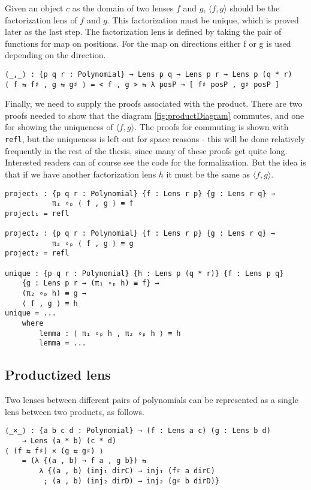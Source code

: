 Given an object $c$ as the domain of two lenses $f$ and $g$, $\langle f,g \rangle$ should be the factorization lens of $f$ and $g$. This factorization must be unique, which is proved later as the last step. The factorization lens is defined by taking the pair of functions for map on positions. For the map on directions either f or g is used depending on the direction.

\begin{verbatim}
⟨_,_⟩ : {p q r : Polynomial} → Lens p q → Lens p r → Lens p (q * r)
⟨ f ⇆ f♯ , g ⇆ g♯ ⟩ = < f , g > ⇆ λ posP → [ f♯ posP , g♯ posP ]
\end{verbatim}

Finally, we need to supply the proofs associated with the product. There are two proofs needed to show that the diagram \ref{fig:productDiagram} commutes, and one for showing the uniqueness of $\langle f,g \rangle$. The proofs for commuting is shown with \texttt{refl}, but the uniqueness is left out for space reasons - this will be done relatively frequently in the rest of the thesis, since many of these proofs get quite long. Interested readers can of course see the code for the formalization\cite{code}. But the idea is that if we have another factorization lens $h$ it must be the same as $\langle f,g \rangle$. 

\begin{verbatim}
project₁ : {p q r : Polynomial} {f : Lens r p} {g : Lens r q} →
           π₁ ∘ₚ ⟨ f , g ⟩ ≡ f
project₁ = refl

project₂ : {p q r : Polynomial} {f : Lens r p} {g : Lens r q} →
           π₂ ∘ₚ ⟨ f , g ⟩ ≡ g
project₂ = refl

unique : {p q r : Polynomial} {h : Lens p (q * r)} {f : Lens p q} 
    {g : Lens p r → (π₁ ∘ₚ h) ≡ f} →
    (π₂ ∘ₚ h) ≡ g → 
    ⟨ f , g ⟩ ≡ h
unique = ...
    where
        lemma : ⟨ π₁ ∘ₚ h , π₂ ∘ₚ h ⟩ ≡ h
        lemma = ...
\end{verbatim}

\subsection{Productized lens}
Two lenses between different pairs of polynomials can be represented as a single lens between two products, as follows.

\begin{verbatim}
⟨_×_⟩ : {a b c d : Polynomial} → (f : Lens a c) (g : Lens b d)
    → Lens (a * b) (c * d)
⟨ (f ⇆ f♯) × (g ⇆ g♯) ⟩ 
    = (λ {(a , b) → f a , g b}) ⇆
        λ {(a , b) (inj₁ dirC) → inj₁ (f♯ a dirC)
         ; (a , b) (inj₂ dirD) → inj₂ (g♯ b dirD)}
\end{verbatim}

